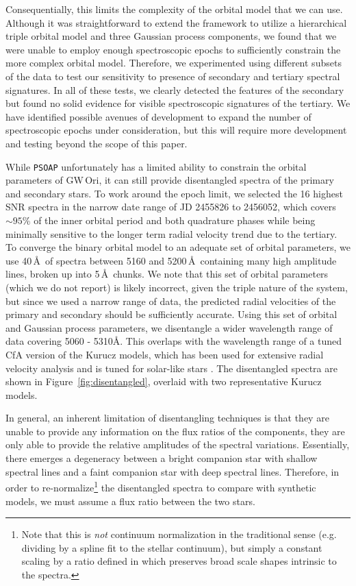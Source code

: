 \documentclass[twocolumn]{aastex61}
\newcommand{\gw}{GW\,Ori}
\begin{document}
Consequentially, this limits the complexity of the orbital model that we can use. Although it was straightforward to extend the framework to utilize a hierarchical triple orbital model and three Gaussian process components, we found that we were unable to employ enough spectroscopic epochs to sufficiently constrain the more complex orbital model. Therefore, we experimented using different subsets of the data to test our sensitivity to presence of secondary and tertiary spectral signatures. In all of these tests, we clearly detected the features of the secondary but found no solid evidence for visible spectroscopic signatures of the tertiary. We have identified possible avenues of development to expand the number of spectroscopic epochs under consideration, but this will require more development and testing beyond the scope of this paper.


While \texttt{PSOAP} unfortunately has a limited ability to constrain the orbital parameters of \gw, it can still provide disentangled spectra of the primary and secondary stars. To work around the epoch limit, we selected the 16 highest SNR spectra in the narrow date range of JD 2455826 to 2456052, which covers $\sim 95$\% of the inner orbital period and both quadrature phases while being minimally sensitive to the longer term radial velocity trend due to the tertiary. To converge the binary orbital model to an adequate set of orbital parameters, we use 40\,\AA\ of spectra between 5160 and 5200\,\AA\ containing many high amplitude lines, broken up into 5\,\AA\ chunks. We note that this set of orbital parameters (which we do not report) is likely incorrect, given the triple nature of the system, but since we used a narrow range of data, the predicted radial velocities of the primary and secondary should be sufficiently accurate. Using this set of orbital and Gaussian process parameters, we disentangle a wider wavelength range of data covering 5060 - 5310\AA. This overlaps with the wavelength range of a tuned CfA version of the Kurucz models, which has been used for extensive radial velocity analysis and is tuned for solar-like stars \citep{buchhave12}. The disentangled spectra are shown in Figure~\ref{fig:disentangled}, overlaid with two representative Kurucz models. 

In general, an inherent limitation of disentangling techniques is that they are unable to provide any information on the flux ratios of the components, they are only able to provide the relative amplitudes of the spectral variations. Essentially, there emerges a degeneracy between a bright companion star with shallow spectral lines and a faint companion star with deep spectral lines. Therefore, in order to re-normalize\footnote{Note that this is \emph{not} continuum normalization in the traditional sense (e.g. dividing by a spline fit to the stellar continuum), but simply a constant scaling by a ratio defined in \citet[Eqn. 32]{czekala17} which preserves broad scale shapes intrinsic to the spectra.} the disentangled spectra to compare with synthetic models, we must assume a flux ratio between the two stars.
\end{document}
